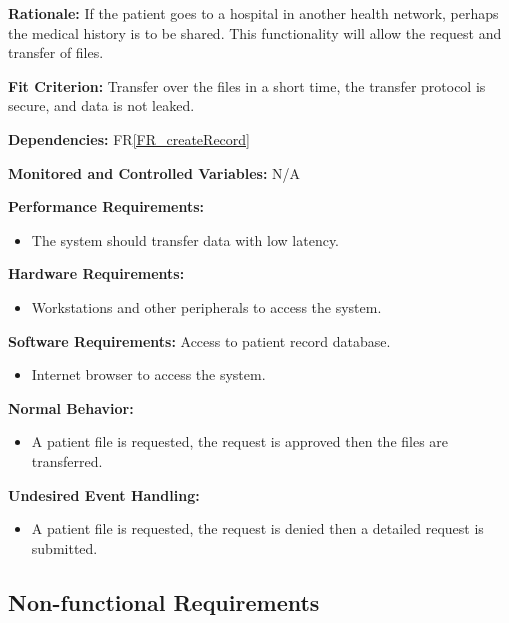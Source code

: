 \documentclass[12pt]{article}
\begin{document}
\begin{itemize}
\textbf{Rationale:} If the patient goes to a hospital in another health network, perhaps the medical history is to be shared. This functionality will allow the request and transfer of files.

\textbf{Fit Criterion:} Transfer over the files in a short time, the transfer protocol is secure, and data is not leaked.

\textbf{Dependencies:} FR\ref{FR_createRecord}

\textbf{Monitored and Controlled Variables:} N/A

\textbf{Performance Requirements:}
\begin{itemize}
  \item The system should transfer data with low latency.
\end{itemize}

\textbf{Hardware Requirements:} 
\begin{itemize}
  \item Workstations and other peripherals to access the system.
\end{itemize}

\textbf{Software Requirements:}
Access to patient record database.
\begin{itemize}
  \item Internet browser to access the system. 
\end{itemize}

\textbf{Normal Behavior:}
\begin{itemize}
  \item A patient file is requested, the request is approved then the files are transferred.
\end{itemize}

\textbf{Undesired Event Handling:}
\begin{itemize}
  \item A patient file is requested, the request is denied then a detailed request is submitted.
\end{itemize}
\end{itemize}



\subsection{Non-functional Requirements} \label{sec_NonFunctionalRequirements}
\end{document}
